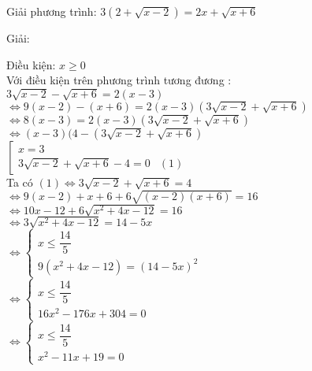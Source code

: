 \begin{vd}
  Giải phương trình: $ 3\left( 2+\sqrt{x-2} \right) =2x +\sqrt{x+6} $
\end{vd}
\begin{center}
    Giải:
\end{center}

Điều kiện: $ x \geq 0 $ \\
Với điều kiện trên phương trình tương đương : \\
$ 3 \sqrt{x-2} -\sqrt{x+6} = 2(x-3) $\\
$ \Leftrightarrow 9 (x-2) - (x+6) = 2(x-3) \left( 3 \sqrt{x-2 } + \sqrt{x+6 } \right) $ \\
$ \Leftrightarrow 8(x - 3) =2(x-3) \left( 3\sqrt{x-2 } + \sqrt{x+6 } \right) $ \\
$ \Leftrightarrow (x-3) ( 4 - \left( 3\sqrt{x-2 } + \sqrt{x+6} \right) $ \\
$ \left[
    \begin{array}{lr}
        x  = 3 & \\
        3\sqrt{x-2 } + \sqrt{ x+ 6} -4 =0 & (1)  
    \end{array}
\right. $\\
Ta có $(1) \Leftrightarrow 3\sqrt{x-2 } + \sqrt{x+6} =4 $\\
$ \Leftrightarrow 9(x-2) + x+6 + 6\sqrt{(x-2)(x+6)} =16 $\\
$ \Leftrightarrow 10x - 12 +6 \sqrt{x^2 +4x -12 } =16 $ \\
$ \Leftrightarrow 3 \sqrt{x^2 +4x -12 } = 14 -5x $\\
$ \Leftrightarrow \begin{cases}
    x \leq  \dfrac{14}{5} \\
    9(x^2 + 4x -12) = (14 -5x)^2 
\end{cases} $ \\
$ \Leftrightarrow \begin{cases}
    x \leq \dfrac{14}{5} \\
    16x^2 - 176x +304 = 0
\end{cases} $ \\
$ \Leftrightarrow \begin{cases}
     x \leq \dfrac{14}{5} \\
     x^2 -11x + 19 =0
\end{cases} $ \\

